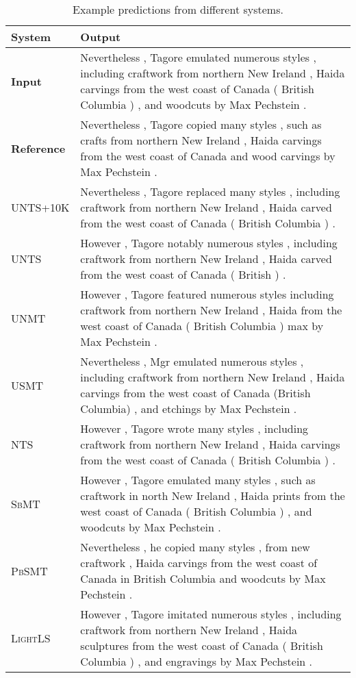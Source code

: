 \documentclass[11pt,a4paper]{article}
\begin{document}
\begin{table*}[t]
\scriptsize
\begin{tabular}{p{3cm} p{12cm}}
\toprule
\textbf{System} & \textbf{Output} \\
\midrule
\textbf{Input} & Nevertheless , Tagore emulated numerous styles , including craftwork from northern New Ireland , Haida carvings from the west coast of Canada ( British Columbia ) , and woodcuts by Max Pechstein .\\
\textbf{Reference} & Nevertheless , Tagore copied many styles , such as crafts from northern New Ireland , Haida carvings from the west coast of Canada and wood carvings by Max Pechstein .\\
\midrule 
\textsc{UNTS}+10K & Nevertheless , Tagore replaced many styles , including craftwork from northern New Ireland , Haida carved from the west coast of Canada ( British Columbia ) . \\ \textsc{UNTS} & However , Tagore notably numerous styles , including craftwork from northern New Ireland , Haida carved from the west coast of Canada ( British ) . \\ \midrule
\textsc{UNMT} & However , Tagore featured numerous styles including craftwork from northern New Ireland , Haida from the west coast of Canada ( British Columbia ) max by Max Pechstein .\\
\textsc{USMT} & Nevertheless , Mgr emulated numerous styles , including craftwork from northern New Ireland , Haida carvings from the west coast of Canada (British Columbia) , and etchings by Max Pechstein .\\
\midrule
\textsc{NTS} & However , Tagore wrote many styles , including craftwork from northern New Ireland , Haida carvings from the west coast of Canada ( British Columbia ) . \\
\textsc{SbMT} & However , Tagore emulated many styles , such as craftwork in north New Ireland , Haida prints from the west coast of Canada ( British Columbia ) , and woodcuts by Max Pechstein . \\
\textsc{PbSMT} & Nevertheless , he copied many styles , from new craftwork , Haida carvings from the west coast of Canada in British Columbia and woodcuts by Max Pechstein . \\
\midrule
\textsc{LightLS} & However , Tagore imitated numerous styles , including craftwork from northern New Ireland , Haida sculptures from the west coast of Canada ( British Columbia ) , and engravings by Max Pechstein . \\
\bottomrule
\end{tabular}
\caption{Example predictions from different systems.}
\label{tab:gens}
\end{table*}
\end{document}
